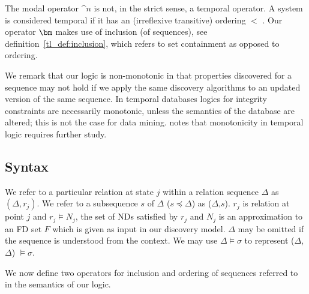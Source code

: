 \medskip

The modal operator $\bm^n$ is not, in the strict sense, a temporal
operator. A system is considered temporal if it has an (irreflexive
transitive) ordering $<$ \cite{ghr94}. Our operator $\bm$ makes use of
inclusion (of sequences), see definition~\ref{tl_def:inclusion}, which
refers to set containment as opposed to ordering.

\smallskip

We remark that our logic is non-monotonic in that properties
discovered for a sequence may not hold if we apply the same discovery
algorithms to an updated version of the same sequence. In temporal
databases logics for integrity constraints are necessarily
monotonic, unless the semantics of the database are altered;  
this is not the case for data mining.  \cite{ghr94} notes
that monotonicity in temporal logic requires further study. 


\subsection{Syntax}


We refer to a particular relation at state $j$ within a relation
sequence $\Delta$ as $(\Delta,r_j)$. We refer to a subsequence $s$ of
$\Delta$ ($s \preceq \Delta$) as ($\Delta$,$s$).
$r_j$ is relation at point $j$ and $r_j \models N_j$, the set of
NDs satisfied by $r_j$ and $N_j$ is an approximation to an FD set $F$
which is given as input in our discovery model.  
$\Delta$ may be omitted if the sequence is understood from the context.
We may use $\Delta \models \sigma$ to represent ($\Delta$,$\Delta$)
$\models \sigma$.

We now define two operators for inclusion and ordering of sequences
referred to in the semantics of our logic. 

